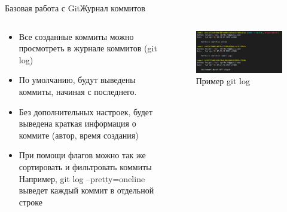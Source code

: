 \begin{frame}{Базовая работа с Git}{Журнал коммитов}
    \begin{columns}
        \begin{column}{0.6\textwidth}
            \begin{itemize}
                \item
                      Все созданные коммиты можно просмотреть в журнале коммитов (git log)
                \item
                      По умолчанию, будут выведены коммиты, начиная с последнего.
                \item
                    Без дополнительных настроек, будет выведена краткая информация о коммите (автор, время создания)
                \item
                      При помощи флагов можно так же сортировать и фильтровать коммиты
                      Например, git log --pretty=oneline выведет каждый коммит в отдельной строке
            \end{itemize}
        \end{column}
        \begin{column}{0.4\textwidth}
            \begin{figure}
                \centering
                \includegraphics[width=\textwidth]{images/git-log-example.png}
                \caption{Пример git log}
            \end{figure}
        \end{column}
    \end{columns}

\end{frame}